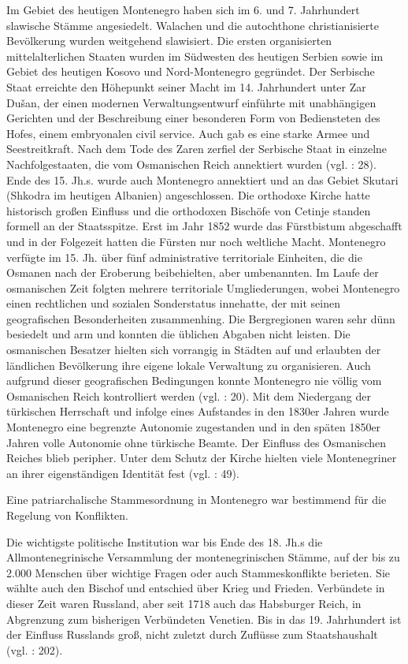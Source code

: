 Im Gebiet des heutigen Montenegro haben sich im 6. und 7. Jahrhundert slawische Stämme angesiedelt. Walachen und die autochthone christianisierte Bevölkerung wurden weitgehend slawisiert. Die ersten organisierten mittelalterlichen Staaten wurden im Südwesten des heutigen Serbien sowie im Gebiet des heutigen Kosovo und Nord-Montenegro gegründet. Der Serbische Staat erreichte den Höhepunkt seiner Macht im 14. Jahrhundert unter Zar Dušan, der einen modernen Verwaltungsentwurf einführte mit unabhängigen Gerichten und der Beschreibung einer besonderen Form von Bediensteten des Hofes, einem embryonalen civil service. Auch gab es eine starke Armee und Seestreitkraft. Nach dem Tode des Zaren zerfiel der Serbische Staat in einzelne Nachfolgestaaten, die vom Osmanischen Reich annektiert wurden (vgl. \cite{beckm90} : 28). Ende des 15. Jh.s. wurde auch Montenegro annektiert und an das Gebiet Skutari (Shkodra im heutigen Albanien) angeschlossen. Die orthodoxe Kirche hatte historisch großen Einfluss und die orthodoxen Bischöfe von Cetinje standen formell an der Staatsspitze. Erst im Jahr 1852 wurde das Fürstbistum abgeschafft und in der Folgezeit hatten die Fürsten nur noch weltliche Macht. Montenegro verfügte im 15. Jh. über fünf administrative territoriale Einheiten, die die Osmanen nach der Eroberung beibehielten, aber umbenannten. Im Laufe der osmanischen Zeit folgten mehrere territoriale Umgliederungen, wobei Montenegro einen rechtlichen und sozialen Sonderstatus innehatte, der mit seinen geografischen Besonderheiten zusammenhing. Die Bergregionen waren sehr dünn besiedelt und arm und konnten die üblichen Abgaben nicht leisten. Die osmanischen Besatzer hielten sich vorrangig in Städten auf und erlaubten der ländlichen Bevölkerung ihre eigene lokale Verwaltung zu organisieren. Auch aufgrund dieser geografischen Bedingungen konnte Montenegro nie völlig vom Osmanischen Reich kontrolliert werden (vgl. \cite{boeck} : 20). Mit dem Niedergang der türkischen Herrschaft und infolge eines Aufstandes in den 1830er Jahren wurde Montenegro eine begrenzte Autonomie zugestanden und in den späten 1850er Jahren volle Autonomie ohne türkische Beamte. Der Einfluss des Osmanischen Reiches blieb peripher. Unter dem Schutz der Kirche hielten viele Montenegriner an ihrer eigenständigen Identität fest (vgl. \cite{sevic} : 49).\par

Eine patriarchalische Stammesordnung in Montenegro war bestimmend für die Regelung von Konflikten.\par
Die wichtigste politische Institution war bis Ende des 18. Jh.s die Allmontenegrinische Versammlung der montenegrinischen Stämme, auf der bis zu 2.000 Menschen über wichtige Fragen oder auch Stammeskonflikte berieten. Sie wählte auch den Bischof und entschied über Krieg und Frieden. Verbündete in dieser Zeit waren Russland, aber seit 1718 auch das Habsburger Reich, in Abgrenzung zum bisherigen Verbündeten Venetien. Bis in das 19. Jahrhundert ist der Einfluss Russlands groß, nicht zuletzt durch Zuflüsse zum Staatshaushalt (vgl. \cite{weithmann} : 202).\par

